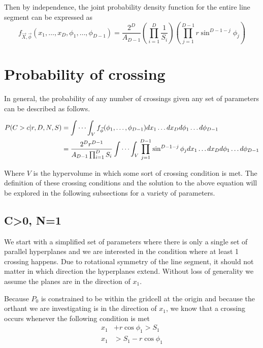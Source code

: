\documentclass{article}
\begin{document}
Then by independence, the joint probability density function for the entire line segment can be expressed as 
\begin{equation} \label{eq:general pdf}
	f_{\vec{X},\vec{\phi}}(x_1, \hdots, x_D, \phi_1, \hdots, \phi_{D-1}) = \frac{2^D}{A_{D-1}}\left(\prod_{i=1}^D\frac{1}{S_i}\right)\left(\prod_{j=1}^{D-1}r\sin^{D-1-j}\phi_j\right)
\end{equation} 

\section{Probability of crossing}
In general, the probability of any number of crossings given any set of parameters can be described as follows.

\begin{align} 
	P(C>c|r, D, N, S)&=\idotsint_V f_{\vec\phi}(\phi_1,\hdots,\phi_{D-1})dx_1 \hdots dx_D d\phi_1 \hdots d\phi_{D-1}\\
	&= \frac{2^Dr^{D-1}}{A_{D-1}\prod_{i=1}^D S_i} \idotsint_V \prod_{j=1}^{D-1}\sin^{D-1-j}\phi_j dx_1\hdots dx_D d\phi_1 \hdots d\phi_{D-1} \label{eq:volume integral}
\end{align}

Where $V$ is the hypervolume in which some sort of crossing condition is met. The definition of these crossing conditions and the solution to the above equation will be
explored in the following subsections for a variety of parameters.

\subsection{C>0, N=1}
We start with a simplified set of parameters where there is only a single set of parallel hyperplanes and we are interested in the condition where at least 1 crossing happens. 
Due to rotational symmetry of the line segment, it should not matter in which direction the hyperplanes extend. Without loss of generality we assume the planes are in the
direction of $x_1$.

Because $P_0$ is constrained to be within the gridcell at the origin and because the orthant we are investigating is in the direction of $x_1$, we know that a crossing occurs
whenever the following condition is met
\begin{align}
	x_1 &+ r\cos{\phi_1} > S_1\\
	x_1 &> S_1 - r\cos{\phi_1}
\end{align}
\end{document}
